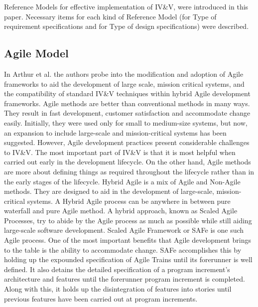 \documentclass[journal, onecolumn]{IEEEtran}
\begin{document}
	\bigskip
	
	Reference Models for effective implementation of IV\&V, were introduced in this paper. Necessary items for each kind of Reference Model (for Type of requirement specifications and for Type of design specifications) were described.
	
	
	\subsection{Agile Model}
	\bigskip
	In Arthur et al. \cite{agile} the authors probe into the modification and adoption of Agile frameworks 
	to aid the development of large scale, mission critical systems, and the compatibility of standard IV\&V techniques within hybrid Agile development frameworks. 
	\newline \newline
	Agile methods are better than conventional methods in many ways. They result in fast development, customer satisfaction and accommodate change easily. Initially, they were used only for small to medium-size systems, but now, an expansion to include large-scale and mission-critical systems has been suggested.
	\newline \newline
	However, Agile development practices present considerable challenges to IV\&V. The most important part of IV\&V is that it is most helpful when carried out early in the development lifecycle. On the other hand, Agile methods are more about defining things as required throughout the lifecycle rather than in the early stages of the lifecycle.
	\newline \newline
	Hybrid Agile is a mix of Agile and Non-Agile methods. They are designed to aid in the development of large-scale, mission-critical systems. A Hybrid Agile process can be anywhere in between pure waterfall and pure Agile method.
	\newline \newline
	A hybrid approach, known as Scaled Agile Processes, try to abide by the Agile process as much as possible while still aiding large-scale software development.
	Scaled Agile Framework or SAFe is one such Agile process. 
	\newline \newline
	One of the most important benefits that Agile development brings to the table is the ability to accommodate change. SAFe accomplishes this by holding up the expounded specification of Agile Trains until its forerunner is well defined. It also detains the detailed specification of a program increment’s architecture and features until the forerunner program increment is completed. Along with this, it holds up the disintegration of features into stories until previous features have been carried out at program increments. 
\end{document}
